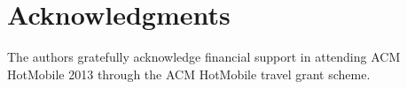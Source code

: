 \vspace{9pt}
\section*{Acknowledgments}
\vspace{-1em}
The authors gratefully acknowledge financial support in attending ACM HotMobile 2013 
through the ACM HotMobile travel grant scheme.
